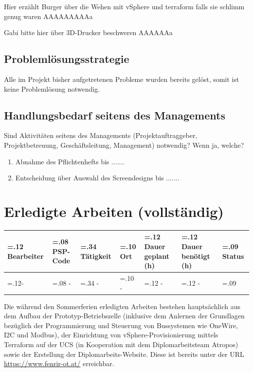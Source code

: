 \documentclass[
	headings=optiontotocandhead,%
	oneside,
	numbers=noenddot,%
	toc=flat, %
	10pt, %
	parskip=full, %
	listof=totoc, %
	listof=flat, %
	numbers=noenddot, %
	bibliography=totoc, %
	a4paper,DIV=14,
]{scrartcl}
\begin{document}
Hier erzählt Burger über die Wehen mit vSphere und terraform falls sie schlimm genug waren AAAAAAAAAa

Gabi bitte hier über 3D-Drucker beschweren AAAAAAa

\subsection{Problemlösungsstrategie}
Alle im Projekt bisher aufgetretenen Probleme wurden bereits gelöst, somit ist keine Problemlösung notwendig.

\subsection{Handlungsbedarf seitens des Managements}
Sind Aktivitäten seitens des Managements (Projektauftraggeber, Projektbetreuung, Geschäftsleitung, Management) notwendig? Wenn ja, welche?

\begin{enumerate}
	\item Abnahme des Pflichtenhefts bis .......
	\item Entscheidung über Auswahl des Screendesigns bis .......
\end{enumerate}

\section{Erledigte Arbeiten (vollständig)}
\begin{table}[h]
	\begin{tabularx} {\textwidth} {
			|>{\hsize=.12\hsize}X
			|>{\hsize=.08\hsize}X
			|>{\hsize=.34\hsize}X
			|>{\hsize=.10\hsize}X
			|>{\hsize=.12\hsize}X
			|>{\hsize=.12\hsize}X
			|>{\hsize=.09\hsize}X|
		}
		
		\hline
		\rowcolor[HTML]{D9D9D9} 
		\textbf{\normalsize{Bearbeiter}} & \textbf{\normalsize{PSP-Code}} & {\textbf{\normalsize{Tätigkeit}}} & \textbf{\normalsize{Ort}} & \textbf{\normalsize{Dauer geplant (h)}} & \textbf{\normalsize{Dauer benötigt (h)}} & \textbf{\normalsize{Status}} \\ \hline
		- & - & - & - & - & - & \cellcolor{green!30} \\ \hline
	\end{tabularx}
\end{table}

Die während den Sommerferien erledigten Arbeiten bestehen hauptsächlich aus dem Aufbau der Prototyp-Betriebszelle (inklusive dem Anlernen der Grundlagen bezüglich der Programmierung und Steuerung von Bussystemen wie OneWire, I2C und Modbus), der Einrichtung von vSphere-Provisionierung mittels Terraform auf der UCS (in Kooperation mit dem Diplomarbeitsteam Atropos) sowie der Erstellung der Diplomarbeits-Website. Diese ist bereits unter der URL \url{https://www.fenrir-ot.at/} erreichbar.
\end{document}
